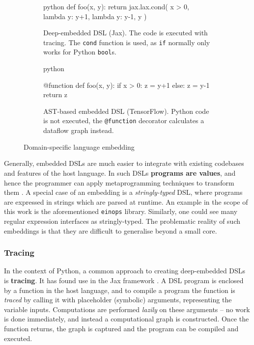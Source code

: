 \begin{figure}
\centering
\begin{subfigure}{.4\textwidth}
  \centering
  \begin{cminted}{python}
def foo(x, y):
  return jax.lax.cond(
    x > 0, 
    lambda y: y+1, 
    lambda y: y-1, 
    y
  )
  \end{cminted}
  \caption{Deep-embedded DSL (Jax). The code is executed with tracing. The \texttt{cond} function is used, as \texttt{if} normally only works for Python \texttt{bool}s.}
\end{subfigure} \quad %
\begin{subfigure}{.4\textwidth}
  \centering
    \begin{cminted}{python}

@function
def foo(x, y):
  if x > 0: z = y+1
  else:     z = y-1
  return z

    \end{cminted}
      \caption{AST-based embedded DSL (TensorFlow). Python code is not executed, the \texttt{@function} decorator calculates a dataflow graph instead.}
\end{subfigure}
\caption{Domain-specific language embedding}
\label{fig:embeddings}
\end{figure}

Generally, embedded DSLs are much easier to integrate with existing codebases and features of the host language.
In such DSLs \textbf{programs are values}, and hence the programmer can apply metaprogramming techniques to transform them \cite{atkey2009unembedding}. 
A special case of an embedding is a \textit{stringly-typed} DSL, where programs are expressed in strings which are parsed at runtime. An example in the scope of this work is the aforementioned \texttt{einops} library.  Similarly, one could see many regular expression interfaces as stringly-typed. The problematic reality of such embeddings is that they are difficult to generalise beyond a small core.

\subsubsection{Tracing} \label{tracing}

In the context of Python, a common approach to creating deep-embedded DSLs is \textbf{tracing}. It has found use in the Jax framework \cite{frostig2018compiling}. A DSL program is enclosed by a function in the host language, and to compile a program the function is \textit{traced} by calling it with placeholder (symbolic) arguments, representing the variable inputs. Computations are performed \textit{lazily} on these arguments -- no work is done immediately, and instead a computational graph is constructed. Once the function returns, the graph is captured and the program can be compiled and executed.

